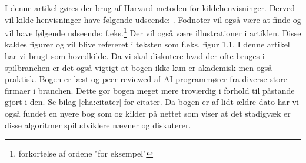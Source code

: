 I denne artikel gøres der brug af Harvard metoden for kildehenvisninger. Derved vil kilde henvisninger have følgende udseende: \textcite[1]{buckland}.
\newline\newline
Fodnoter vil også være at finde og vil have følgende udseende: f.eks.\footnote{forkortelse af ordene "for eksempel"}
\newline\newline
Der vil også være illustrationer i artiklen. Disse kaldes figurer og vil blive refereret i teksten som f.eks. figur 1.1.
\newline\newline
I denne artikel har vi brugt \textcite{buckland} som hovedkilde. Da vi skal diskutere hvad der ofte bruges i spilbranchen er det også vigtigt at bogen ikke kun er akademisk men også praktisk. Bogen er læst og peer reviewed af AI programmører fra diverse store firmaer i branchen. Dette gør bogen meget mere troværdig i forhold til påstande gjort i den. Se bilag \ref{cha:citater} for citater.
\newline\newline
Da bogen er af lidt ældre dato har vi også fundet en nyere bog som \textcite{MillingtonFunge} og kilder på nettet som viser at det stadigvæk er disse algoritmer spiludviklere nævner og diskuterer.